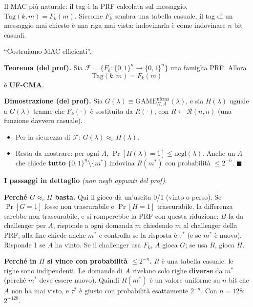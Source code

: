 \begin{inbreve}
Il MAC più naturale: il tag è la PRF calcolata sul messaggio, \(\text{Tag}(k, m) = F_k(m)\). Siccome \(F_k\) sembra una tabella casuale, il tag di un messaggio mai chiesto è una riga mai vista: indovinarla è come indovinare \(n\) bit casuali.
\end{inbreve}

``Costruiamo MAC efficienti''.

\textbf{Teorema (del prof).} Sia \(\mathcal{F} = \{F_k : \{0,1\}^n \to \{0,1\}^n\}\) una famiglia PRF. Allora
\[
\text{Tag}(k, m) = F_k(m)
\]
è \textbf{UF-CMA}.

\textbf{Dimostrazione (del prof).} Sia \(G(\lambda) \equiv \text{GAME}^{\text{ufcma}}_{\Pi, A}(\lambda)\), e sia \(H(\lambda)\) uguale a \(G(\lambda)\) tranne che \(F_k(\cdot)\) è sostituita da \(R(\cdot)\), con \(R \leftarrow \mathcal{R}(n, n)\) (una funzione davvero casuale).

\begin{itemize}
  \item Per la sicurezza di \(\mathcal{F}\): \(G(\lambda) \approx_c H(\lambda)\).
  \item Resta da mostrare: per ogni \(A\), \(\Pr[H(\lambda) = 1] \le \text{negl}(\lambda)\). Anche un \(A\) che chiede \textbf{tutto} \(\{0,1\}^n \setminus \{m^*\}\) indovina \(R(m^*)\) con probabilità \(\le 2^{-n}\). \(\blacksquare\)
\end{itemize}

\begin{nota}
\textbf{I passaggi in dettaglio} \emph{(non negli appunti del prof)}.

\textbf{Perché \(G \approx_c H\) basta.} Qui il gioco dà un'uscita 0/1 (vinto o perso). Se \(\Pr[G = 1]\) fosse non trascurabile e \(\Pr[H = 1]\) trascurabile, la differenza sarebbe non trascurabile, e si romperebbe la PRF con questa riduzione: \(B\) fa da challenger per \(A\), risponde a ogni domanda \(m\) chiedendo \(m\) al challenger della PRF; alla fine chiede anche \(m^*\) e controlla se la risposta è \(\tau^*\) (e se \(m^*\) è nuovo). Risponde 1 se \(A\) ha vinto. Se il challenger usa \(F_k\), \(A\) gioca \(G\); se usa \(R\), gioca \(H\).

\textbf{Perché in \(H\) si vince con probabilità \(\le 2^{-n}\).} \(R\) è una tabella casuale: le righe sono indipendenti. Le domande di \(A\) rivelano solo righe \textbf{diverse} da \(m^*\) (perché \(m^*\) deve essere nuovo). Quindi \(R(m^*)\) è un valore uniforme su \(n\) bit che \(A\) non ha mai visto, e \(\tau^*\) è giusto con probabilità esattamente \(2^{-n}\). Con \(n = 128\): \(2^{-128}\).
\end{nota}

